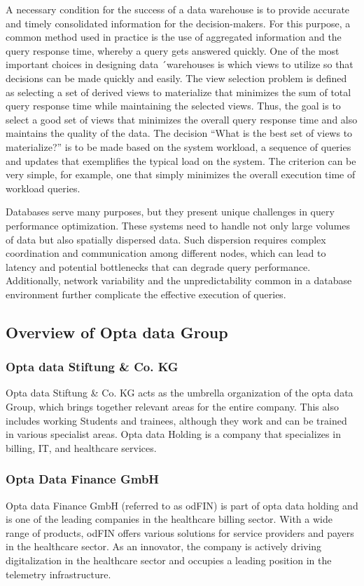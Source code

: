 A necessary condition for the success of a data warehouse is to provide accurate and timely consolidated information for the decision-makers. For this purpose, a common method used in practice is the use of aggregated information and the query response time, whereby a query gets answered quickly. One of the most important choices in designing data ´warehouses is which views to utilize so that decisions can be made quickly and easily. The view selection problem is defined as selecting a set of derived views to materialize that minimizes the sum of total query response time while maintaining the selected views. Thus, the goal is to select a good set of views that minimizes the overall query response time and also maintains the quality of the data. The decision ``What is the best set of views to materialize?'' is to be made based on the system workload, a sequence of queries and updates that exemplifies the typical load on the system. The criterion can be very simple, for example, one that simply minimizes the overall execution time of workload queries\cite{Academia-Juan-ale-2014,Kardel_Thakare}.\vspace{.4cm}


Databases serve many purposes, but they present unique challenges in query performance optimization. These systems need to handle not only large volumes of data but also spatially dispersed data. Such dispersion requires complex coordination and communication among different nodes, which can lead to latency and potential bottlenecks that can degrade query performance. Additionally, network variability and the unpredictability common in a database environment further complicate the effective execution of queries.

\subsection{Overview of Opta data Group}
\subsubsection{Opta data Stiftung \& Co. KG }
Opta data Stiftung \& Co. KG acts as the umbrella organization of the opta data Group, which brings together relevant areas for the entire company. This also includes working Students and trainees, although they work and can be trained in various specialist areas. Opta data Holding is a company that specializes in billing, IT, and healthcare services.

\subsubsection{Opta Data Finance GmbH  }
Opta data Finance GmbH (referred to as odFIN) is part of opta data holding and is one of the leading companies in the healthcare billing sector. With a wide range of products, odFIN offers various solutions for service providers and payers in the healthcare sector. As an innovator, the company is actively driving digitalization in the healthcare sector and occupies a leading position in the telemetry infrastructure.

